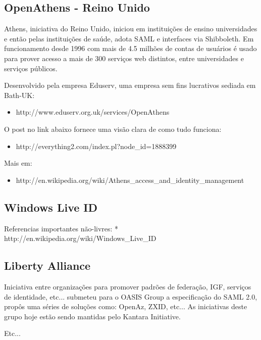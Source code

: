 \documentclass[11pt]{article}
\begin{document}
\subsection{OpenAthens - Reino Unido}

Athens, iniciativa do Reino Unido, iniciou em instituições de ensino
universidades e então pelas instituições de saúde, adota SAML e interfaces via
Shibboleth. Em funcionamento desde 1996 com mais de 4.5 milhões de contas de
usuários é usado para prover acesso a mais de 300 serviços web distintos,
entre universidades e serviços públicos.

Desenvolvido pela empresa Eduserv, uma empresa sem fins lucrativos sediada em
Bath-UK:

\begin{itemize}
  \item{http://www.eduserv.org.uk/services/OpenAthens}
\end{itemize}

O post no link abaixo fornece uma visão clara de como tudo funciona:

\begin{itemize}
  \item{http://everything2.com/index.pl?node\_id=1888399}
\end{itemize}

Mais em:
\begin{itemize}
  \item{http://en.wikipedia.org/wiki/Athens\_access\_and\_identity\_management}
\end{itemize}

\subsection{Windows Live ID}

Referencias importantes não-livres:
* http://en.wikipedia.org/wiki/Windows\_Live\_ID

\subsection{Liberty Alliance}

Iniciativa entre organizações para promover padrões de federação, IGF,
serviços de identidade, etc... submeteu para o OASIS Group a especificação do
SAML 2.0, propôs uma séries de soluções como: OpenAz, ZXID, etc... As
iniciativas deste grupo hoje estão sendo mantidas pelo Kantara Initiative.

Etc...
\end{document}
